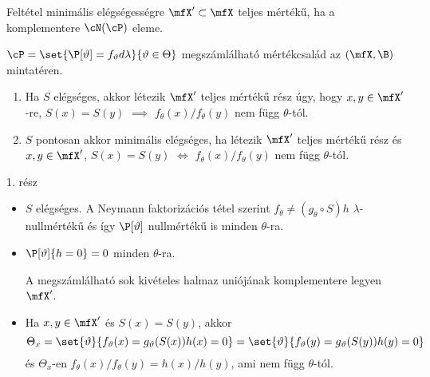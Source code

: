 \documentclass[aspectratio=169,notheorems,9pt,\option]{beamer}
\begin{document}
\begin{frame}{Feltétel minimális elégségességre}
  $\mfX'\subset\mfX$ teljes mértékű, ha a komplementere $\cN(\cP)$ eleme.
  \begin{theorem} $\cP=\set{\P[\theta]=f_\theta d\lambda}{\theta\in\Theta}$ megszámlálható
     mértékcsalád az $(\mfX,\B)$ mintatéren.
    \begin{enumerate}[<*>]
      \item Ha $S$ elégséges, akkor létezik $\mfX'$ teljes mértékű rész úgy, hogy $x,y\in\mfX'$-re, $S(x)=S(y)$ $\implies$  
      $f_\theta(x)/f_\theta(y)$ nem függ $\theta$-tól.
      \item $S$ pontosan akkor minimális elégséges, ha létezik $\mfX'$ teljes mértékű rész és $x,y\in\mfX'$, 
      $S(x)=S(y)$ $\iff$  $f_\theta(x)/f_\theta(y)$ nem függ $\theta$-tól.
    \end{enumerate}
  \end{theorem}
  1. rész
  \begin{itemize}
    \item $S$ elégséges. A Neymann faktorizációs tétel szerint
    $f_\theta\neq (g_\theta\circ S)h$ $\lambda$-nullmértékű
    és így $\P[\theta]$ nullmértékű is minden $\theta$-ra. 

    \item $\P[\theta]{h=0}=0$  minden $\theta$-ra.
    
    A megszámlálható sok kivételes halmaz uniójának komplementere legyen $\mfX'$.
    
    \item Ha $x,y\in\mfX'$ és $S(x)=S(y)$, akkor 
    \begin{displaymath}
      \Theta_{x}=\set{\theta}{f_\theta(x)=g_\theta(S(x))h(x)=0}
      =\set{\theta}{f_\theta(y)=g_\theta(S(y))h(y)=0}
    \end{displaymath} 
    és $\Theta_x$-en
    $f_\theta(x)/f_\theta(y)=h(x)/h(y)$, ami nem függ $\theta$-tól.

  \end{itemize}
\end{frame}
\end{document}
